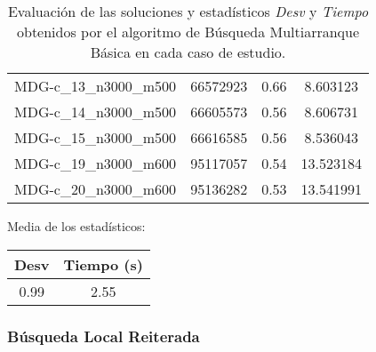 \documentclass{article}
\begin{document}
\begin{table}[H]
\begin{tabular}{|cccc|}
		MDG-c\_13\_n3000\_m500 & 66572923 & 0.66 & 8.603123\\
		MDG-c\_14\_n3000\_m500 & 66605573 & 0.56 & 8.606731\\
		MDG-c\_15\_n3000\_m500 & 66616585 & 0.56 & 8.536043\\
		MDG-c\_19\_n3000\_m600 & 95117057 & 0.54 & 13.523184\\
		MDG-c\_20\_n3000\_m600 & 95136282 & 0.53 & 13.541991\\
		\hline
	\end{tabular}
	\caption{Evaluación de las soluciones y estadísticos \emph{Desv} y \emph{Tiempo} obtenidos por el algoritmo de Búsqueda Multiarranque Básica en cada caso de estudio.}
	\label{tab:bmb}
\end{table}

Media de los estadísticos:
\begin{table}[H]
	\centering
	\begin{tabular}{|cc|}
		\hline
		Desv & Tiempo (s)\\ \hline
		0.99 & 2.55 \\
		\hline
	\end{tabular}
\end{table}

\pagebreak

\subsubsection*{Búsqueda Local Reiterada}
\end{document}
